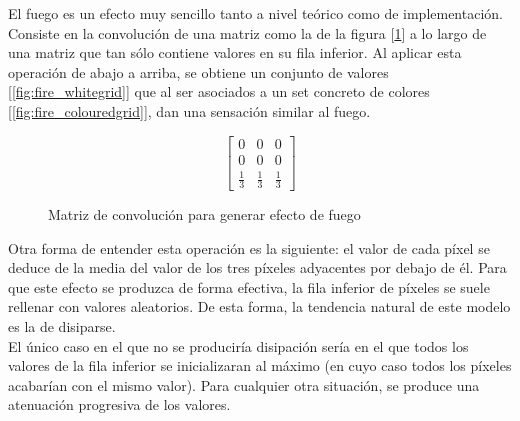 El fuego es un efecto muy sencillo tanto a nivel teórico como de implementación. Consiste en la convolución de una matriz como la de la figura [\ref{fig:firematrix}] a lo largo de una matriz que tan sólo contiene valores en su fila inferior. Al aplicar esta operación de abajo a arriba, se obtiene un conjunto de valores [\ref{fig:fire_whitegrid}] que al ser asociados a un set concreto de colores [\ref{fig:fire_colouredgrid}], dan una sensación similar al fuego.\\

\begin{figure}
	\begin{equation}
		\begin{bmatrix}
			0 & 0 & 0 \\
			0 & 0 & 0 \\
			\frac{1}{3} & \frac{1}{3} & \frac{1}{3}
		\end{bmatrix}
	\end{equation}
	\caption{Matriz de convolución para generar efecto de fuego}
	\label{fig:firematrix}
\end{figure}

Otra forma de entender esta operación es la siguiente: el valor de cada píxel se deduce de la media del valor de los tres píxeles adyacentes por debajo de él. Para que este efecto se produzca de forma efectiva, la fila inferior de píxeles se suele rellenar con valores aleatorios. De esta forma, la tendencia natural de este modelo es la de disiparse.\\

El único caso en el que no se produciría disipación sería en el que todos los valores de la fila inferior se inicializaran al máximo (en cuyo caso todos los píxeles acabarían con el mismo valor). Para cualquier otra situación, se produce una atenuación progresiva de los valores. 

